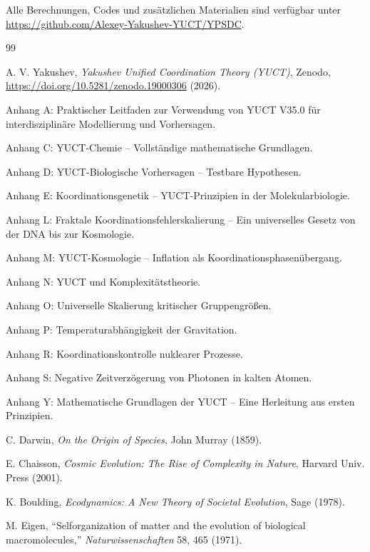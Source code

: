 \documentclass[12pt,a4paper]{article}
\theoremstyle{remark}
\begin{document}
	Alle Berechnungen, Codes und zusätzlichen Materialien sind verfügbar unter \url{https://github.com/Alexey-Yakushev-YUCT/YPSDC}.
	
	\begin{thebibliography}{99}
		
		A. V. Yakushev, \emph{Yakushev Unified Coordination Theory (YUCT)}, Zenodo, \url{https://doi.org/10.5281/zenodo.19000306} (2026).
		
		Anhang A: Praktischer Leitfaden zur Verwendung von YUCT V35.0 für interdisziplinäre Modellierung und Vorhersagen.
		
		Anhang C: YUCT-Chemie – Vollständige mathematische Grundlagen.
		
		Anhang D: YUCT-Biologische Vorhersagen – Testbare Hypothesen.
		
		Anhang E: Koordinationsgenetik – YUCT-Prinzipien in der Molekularbiologie.
		
		Anhang L: Fraktale Koordinationsfehlerskalierung – Ein universelles Gesetz von der DNA bis zur Kosmologie.
		
		Anhang M: YUCT-Kosmologie – Inflation als Koordinationsphasenübergang.
		
		Anhang N: YUCT und Komplexitätstheorie.
		
		Anhang O: Universelle Skalierung kritischer Gruppengrößen.
		
		Anhang P: Temperaturabhängigkeit der Gravitation.
		
		Anhang R: Koordinationskontrolle nuklearer Prozesse.
		
		Anhang S: Negative Zeitverzögerung von Photonen in kalten Atomen.
		
		Anhang Y: Mathematische Grundlagen der YUCT – Eine Herleitung aus ersten Prinzipien.
		
		C. Darwin, \emph{On the Origin of Species}, John Murray (1859).
		
		E. Chaisson, \emph{Cosmic Evolution: The Rise of Complexity in Nature}, Harvard Univ. Press (2001).
		
		K. Boulding, \emph{Ecodynamics: A New Theory of Societal Evolution}, Sage (1978).
		
		M. Eigen, ``Selforganization of matter and the evolution of biological macromolecules,'' \emph{Naturwissenschaften} 58, 465 (1971).
		

\end{thebibliography}
\end{document}
